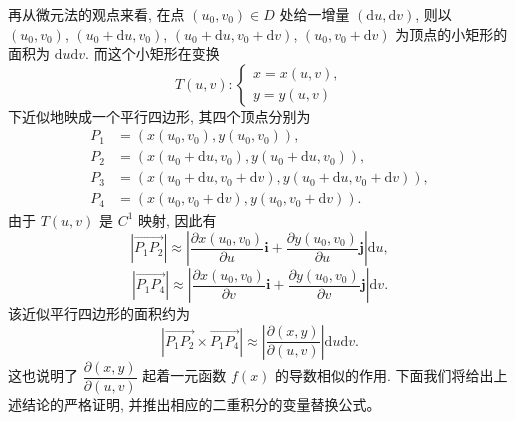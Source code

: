 \documentclass[12pt,fontset=fandol]{ctexart}
\begin{document}
再从微元法的观点来看, 在点 $(u_0,v_0)\in D$ 处给一增量 $(\mathrm du,\mathrm dv)$, 则以 $(u_0,v_0)$, $(u_0+\mathrm du,v_0)$, $(u_0+\mathrm du,v_0+\mathrm dv)$, $(u_0,v_0+\mathrm dv)$ 为顶点的小矩形的面积为 $\mathrm du\mathrm dv$. 而这个小矩形在变换
\[
  T(u,v):
  \begin{cases}
    x=x(u,v),\\
    y=y(u,v)
  \end{cases}
\]
下近似地映成一个平行四边形, 其四个顶点分别为
\[
\begin{aligned}
  P_1&=(x(u_0,v_0),y(u_0,v_0)),\\
  P_2&=(x(u_0+\mathrm du,v_0),y(u_0+\mathrm du,v_0)),\\
  P_3&=(x(u_0+\mathrm du,v_0+\mathrm dv),y(u_0+\mathrm du,v_0+\mathrm dv)),\\
  P_4&=(x(u_0,v_0+\mathrm dv),y(u_0,v_0+\mathrm dv)).
\end{aligned}
\]
由于 $T(u,v)$ 是 $C^1$ 映射, 因此有
\[
  |\overrightarrow{P_1P_2}|\approx
  \left|\frac{\partial x(u_0,v_0)}{\partial u}\boldsymbol i
  +\frac{\partial y(u_0,v_0)}{\partial u}\boldsymbol j\right|\mathrm du,
\]
\[
  |\overrightarrow{P_1P_4}|\approx
  \left|\frac{\partial x(u_0,v_0)}{\partial v}\boldsymbol i
  +\frac{\partial y(u_0,v_0)}{\partial v}\boldsymbol j\right|\mathrm dv.
\]
该近似平行四边形的面积约为
\[
  |\overrightarrow{P_1P_2}\times\overrightarrow{P_1P_4}|
  \approx
  \left|\frac{\partial(x,y)}{\partial(u,v)}\right|\mathrm du\mathrm dv.
\]
这也说明了 $\dfrac{\partial(x,y)}{\partial(u,v)}$ 起着一元函数 $f(x)$ 的导数相似的作用. 下面我们将给出上述结论的严格证明, 并推出相应的二重积分的变量替换公式。
\end{document}
